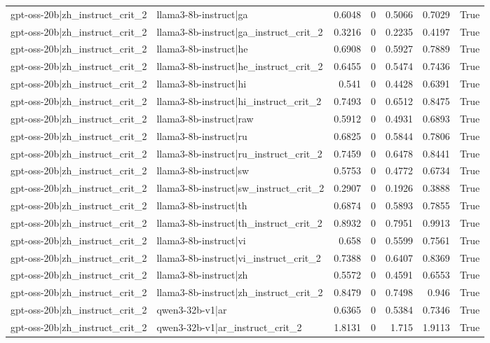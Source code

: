 \begin{table}
\begin{tabular}{l l r r r r l}
gpt-oss-20b|zh_instruct_crit_2 & llama3-8b-instruct|ga & 0.6048 & 0 & 0.5066 & 0.7029 & True \\
gpt-oss-20b|zh_instruct_crit_2 & llama3-8b-instruct|ga_instruct_crit_2 & 0.3216 & 0 & 0.2235 & 0.4197 & True \\
gpt-oss-20b|zh_instruct_crit_2 & llama3-8b-instruct|he & 0.6908 & 0 & 0.5927 & 0.7889 & True \\
gpt-oss-20b|zh_instruct_crit_2 & llama3-8b-instruct|he_instruct_crit_2 & 0.6455 & 0 & 0.5474 & 0.7436 & True \\
gpt-oss-20b|zh_instruct_crit_2 & llama3-8b-instruct|hi & 0.541 & 0 & 0.4428 & 0.6391 & True \\
gpt-oss-20b|zh_instruct_crit_2 & llama3-8b-instruct|hi_instruct_crit_2 & 0.7493 & 0 & 0.6512 & 0.8475 & True \\
gpt-oss-20b|zh_instruct_crit_2 & llama3-8b-instruct|raw & 0.5912 & 0 & 0.4931 & 0.6893 & True \\
gpt-oss-20b|zh_instruct_crit_2 & llama3-8b-instruct|ru & 0.6825 & 0 & 0.5844 & 0.7806 & True \\
gpt-oss-20b|zh_instruct_crit_2 & llama3-8b-instruct|ru_instruct_crit_2 & 0.7459 & 0 & 0.6478 & 0.8441 & True \\
gpt-oss-20b|zh_instruct_crit_2 & llama3-8b-instruct|sw & 0.5753 & 0 & 0.4772 & 0.6734 & True \\
gpt-oss-20b|zh_instruct_crit_2 & llama3-8b-instruct|sw_instruct_crit_2 & 0.2907 & 0 & 0.1926 & 0.3888 & True \\
gpt-oss-20b|zh_instruct_crit_2 & llama3-8b-instruct|th & 0.6874 & 0 & 0.5893 & 0.7855 & True \\
gpt-oss-20b|zh_instruct_crit_2 & llama3-8b-instruct|th_instruct_crit_2 & 0.8932 & 0 & 0.7951 & 0.9913 & True \\
gpt-oss-20b|zh_instruct_crit_2 & llama3-8b-instruct|vi & 0.658 & 0 & 0.5599 & 0.7561 & True \\
gpt-oss-20b|zh_instruct_crit_2 & llama3-8b-instruct|vi_instruct_crit_2 & 0.7388 & 0 & 0.6407 & 0.8369 & True \\
gpt-oss-20b|zh_instruct_crit_2 & llama3-8b-instruct|zh & 0.5572 & 0 & 0.4591 & 0.6553 & True \\
gpt-oss-20b|zh_instruct_crit_2 & llama3-8b-instruct|zh_instruct_crit_2 & 0.8479 & 0 & 0.7498 & 0.946 & True \\
gpt-oss-20b|zh_instruct_crit_2 & qwen3-32b-v1|ar & 0.6365 & 0 & 0.5384 & 0.7346 & True \\
gpt-oss-20b|zh_instruct_crit_2 & qwen3-32b-v1|ar_instruct_crit_2 & 1.8131 & 0 & 1.715 & 1.9113 & True \\

\end{tabular}
\end{table}
